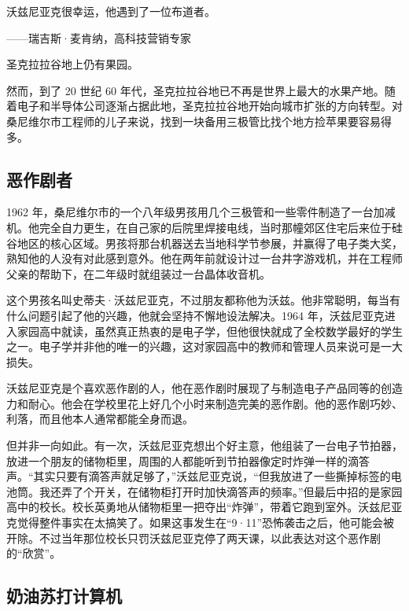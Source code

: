 \documentclass[12pt,UTF8]{ctexbook}
\begin{document}
沃兹尼亚克很幸运，他遇到了一位布道者。

——瑞吉斯·麦肯纳，高科技营销专家



圣克拉拉谷地上仍有果园。

然而，到了 20 世纪 60 年代，圣克拉拉谷地已不再是世界上最大的水果产地。随着电子和半导体公司逐渐占据此地，圣克拉拉谷地开始向城市扩张的方向转型。对桑尼维尔市工程师的儿子来说，找到一块备用三极管比找个地方捡苹果要容易得多。





\subsection{恶作剧者}


1962 年，桑尼维尔市的一个八年级男孩用几个三极管和一些零件制造了一台加减机。他完全自力更生，在自己家的后院里焊接电线，当时那幢郊区住宅后来位于硅谷地区的核心区域。男孩将那台机器送去当地科学节参展，并赢得了电子类大奖，熟知他的人没有对此感到意外。他在两年前就设计过一台井字游戏机，并在工程师父亲的帮助下，在二年级时就组装过一台晶体收音机。

这个男孩名叫史蒂夫·沃兹尼亚克，不过朋友都称他为沃兹。他非常聪明，每当有什么问题引起了他的兴趣，他就会坚持不懈地设法解决。1964 年，沃兹尼亚克进入家园高中就读，虽然真正热衷的是电子学，但他很快就成了全校数学最好的学生之一。电子学并非他的唯一的兴趣，这对家园高中的教师和管理人员来说可是一大损失。

沃兹尼亚克是个喜欢恶作剧的人，他在恶作剧时展现了与制造电子产品同等的创造力和耐心。他会在学校里花上好几个小时来制造完美的恶作剧。他的恶作剧巧妙、利落，而且他本人通常都能全身而退。

但并非一向如此。有一次，沃兹尼亚克想出个好主意，他组装了一台电子节拍器，放进一个朋友的储物柜里，周围的人都能听到节拍器像定时炸弹一样的滴答声。“其实只要有滴答声就足够了，”沃兹尼亚克说，“但我放进了一些撕掉标签的电池筒。我还弄了个开关，在储物柜打开时加快滴答声的频率。”但最后中招的是家园高中的校长。校长英勇地从储物柜里一把夺出“炸弹”，带着它跑到室外。沃兹尼亚克觉得整件事实在太搞笑了。如果这事发生在“9·11”恐怖袭击之后，他可能会被开除。不过当年那位校长只罚沃兹尼亚克停了两天课，以此表达对这个恶作剧的“欣赏”。





\subsection{奶油苏打计算机}
\end{document}
